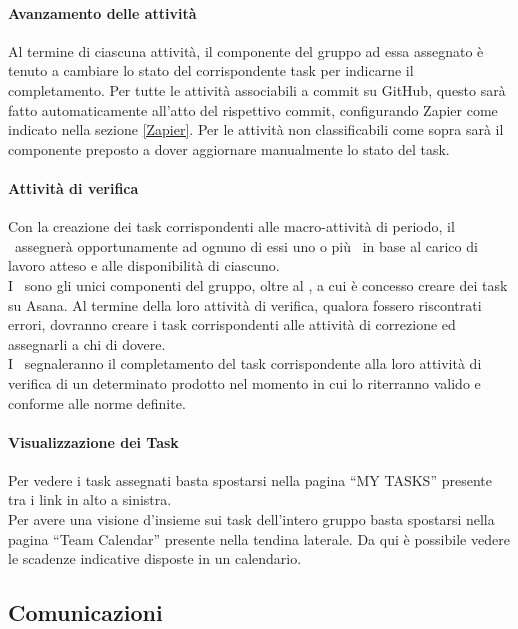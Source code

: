 \documentclass[../NormeDiProgetto.tex]{subfiles}
\begin{document}
				\paragraph{Avanzamento delle attività\\}
					Al termine di ciascuna attività, il componente del gruppo ad essa assegnato è tenuto a
					cambiare lo stato del corrispondente task per indicarne il completamento.
					Per tutte le attività associabili a commit su GitHub, questo sarà fatto automaticamente
					all'atto del rispettivo commit, configurando Zapier come indicato nella sezione \ref{Zapier}.
					Per le attività non classificabili come sopra sarà il componente preposto a dover
					aggiornare manualmente lo stato del task.
				\paragraph{Attività di verifica\\}
					Con la creazione dei task corrispondenti alle macro-attività di periodo, il
					\responsabilediprogetto\ assegnerà opportunamente ad ognuno di essi uno o più \verificatori\
					in base al carico di lavoro atteso e alle disponibilità di ciascuno.\\
					I \verificatori\ sono gli unici componenti del gruppo, oltre al \responsabilediprogetto, a
					cui è concesso creare dei task su Asana. Al termine della loro attività di verifica, qualora
					fossero riscontrati errori, dovranno creare i task corrispondenti alle attività di correzione
					ed assegnarli a chi di dovere.\\
					I \verificatori\ segnaleranno il completamento del task corrispondente alla loro attività di
					verifica di un determinato prodotto nel momento in cui lo riterranno valido e conforme
					alle norme definite.
				\paragraph{Visualizzazione dei Task\\}
					Per vedere i task assegnati basta spostarsi nella pagina ``MY
					TASKS'' presente tra i link in alto a sinistra.\\
					Per avere una visione d'insieme sui task dell'intero gruppo basta
					spostarsi nella pagina ``Team Calendar'' presente nella tendina
					laterale. Da qui è possibile vedere le scadenze indicative disposte
					in un calendario.
		\subsection{Comunicazioni}
\end{document}
